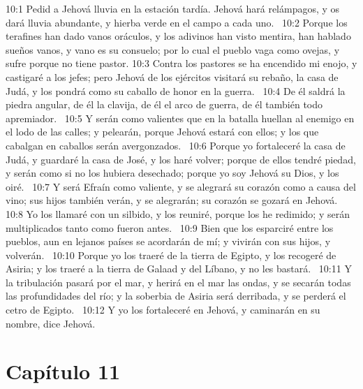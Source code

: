 10:1 Pedid a Jehová lluvia en la estación tardía. Jehová hará relámpagos, y os dará lluvia abundante, y hierba verde en el campo a cada uno.  
10:2 Porque los terafines han dado vanos oráculos, y los adivinos han visto mentira, han hablado sueños vanos, y vano es su consuelo; por lo cual el pueblo vaga como ovejas, y sufre porque no tiene pastor. 
10:3 Contra los pastores se ha encendido mi enojo, y castigaré a los jefes; pero Jehová de los ejércitos visitará su rebaño, la casa de Judá, y los pondrá como su caballo de honor en la guerra.  
10:4 De él saldrá la piedra angular, de él la clavija, de él el arco de guerra, de él también todo apremiador.  
10:5 Y serán como valientes que en la batalla huellan al enemigo en el lodo de las calles; y pelearán, porque Jehová estará con ellos; y los que cabalgan en caballos serán avergonzados.  
10:6 Porque yo fortaleceré la casa de Judá, y guardaré la casa de José, y los haré volver; porque de ellos tendré piedad, y serán como si no los hubiera desechado; porque yo soy Jehová su Dios, y los oiré.  
10:7 Y será Efraín como valiente, y se alegrará su corazón como a causa del vino; sus hijos también verán, y se alegrarán; su corazón se gozará en Jehová.  
10:8 Yo los llamaré con un silbido, y los reuniré, porque los he redimido; y serán multiplicados tanto como fueron antes.  
10:9 Bien que los esparciré entre los pueblos, aun en lejanos países se acordarán de mí; y vivirán con sus hijos, y volverán.  
10:10 Porque yo los traeré de la tierra de Egipto, y los recogeré de Asiria; y los traeré a la tierra de Galaad y del Líbano, y no les bastará.  
10:11 Y la tribulación pasará por el mar, y herirá en el mar las ondas, y se secarán todas las profundidades del río; y la soberbia de Asiria será derribada, y se perderá el cetro de Egipto.  
10:12 Y yo los fortaleceré en Jehová, y caminarán en su nombre, dice Jehová.  
\section*{Capítulo 11 }

